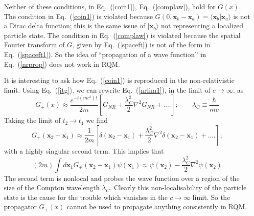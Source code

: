 \documentclass{article}
\def\eq#1{{Eq.~(\ref{#1})}}
\def\ket#1{|#1\rangle}                    %
\def\amp#1#2{\langle #1 | #2\rangle}      %
\begin{document}
 Neither of these conditions, in \eq{coin1}, \eq{complaw}, hold for $G(x)$. The  condition in \eq{coin1} is violated because $G(0,\bm{x}_b-\bm{x}_a)=\amp{\bm{x}_b}{\bm{x}_a}$ is not a Dirac delta function; this is the same issue of $\ket{\bm{x}_b}$ not representing a localized particle state. 
 The  condition in \eq{complaw} is violated because the spatial Fourier transform of $G$, given by \eq{spaceft} is not of the form in \eq{spaceft1}. So the idea of ``propagation of a wave function'' in \eq{nrprop} does not work in RQM.
 
 It is interesting to ask how \eq{coin1} is reproduced in the non-relativistic limit. 
 Using \eq{itg}, we can rewrite \eq{nrlim1}, in the limit of $c\to\infty$, as
 \begin{equation}
 G_+(x)\approx\frac{e^{-i(mc^2)t}}{2m}\left[G_{NR}+\frac{\lambda_C^2}{2}\nabla^2 G_{NR}+ ....\right];
 \qquad \lambda_C\equiv\frac{\hbar}{mc}
 \label{nrlim2}
\end{equation} 
Taking the limit of $t_2\to t_1$ we find
\begin{equation}
G_+(\bm{x}_2-\bm{x}_1)\approx\frac{1}{2m}\left[\delta(\bm{x}_2-\bm{x}_1)+\frac{\lambda_C^2}{2}\nabla^2\delta(\bm{x}_2-\bm{x}_1) + ....\right];
 \label{nrlim3}
\end{equation} 
with a highly singular second term. This implies that
\begin{equation}
 (2m)\int d\bm{x}_1G_+(\bm{x}_2-\bm{x}_1)\psi(\bm{x}_1)\approx\psi(\bm{x}_2)-\frac{\lambda_C^2}{2}\nabla^2\psi(\bm{x}_2)
\end{equation} 
The second term is nonlocal and probes the wave function over a region of the size of the Compton wavelength $\lambda_C$. Clearly this non-localisability of the particle state is the cause for the trouble which vanishes in the $c\to\infty$ limit. So the propagator $G_+(x)$ cannot be used to propagate anything consistently in RQM.
 
\end{document}
